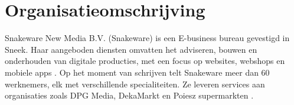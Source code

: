 \section{Organisatieomschrijving}
Snakeware New Media B.V. (Snakeware) is een E-business bureau gevestigd in Sneek.
Haar aangeboden diensten omvatten het adviseren, bouwen en onderhouden van digitale
producties, met een focus op websites, webshops en mobiele apps \Parencite{SnakewareWhatWeDo}. Op
het moment van schrijven telt Snakeware meer dan 60 werknemers, elk met verschillende
specialiteiten. Ze leveren services aan organisaties zoals DPG Media, DekaMarkt
en Poiesz supermarkten \Parencite{SnakewareCases}.

